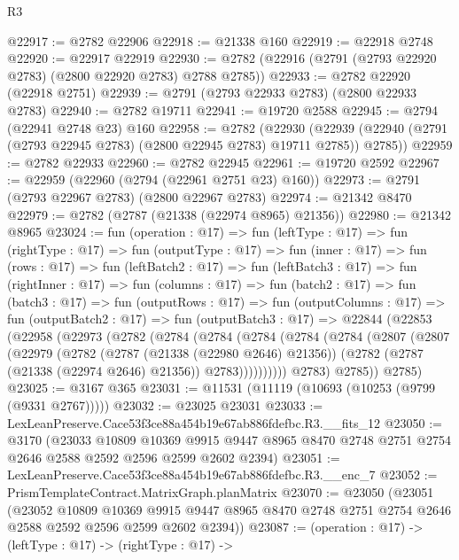 \begin{lexlean}{R3}
\begin{coremodule}
@22917 := @2782 @22906
@22918 := @21338 @160
@22919 := @22918 @2748
@22920 := @22917 @22919
@22930 := @2782 (@22916 (@2791 (@2793 @22920 @2783) (@2800 @22920 @2783) @2788 @2785))
@22933 := @2782 @22920 (@22918 @2751)
@22939 := @2791 (@2793 @22933 @2783) (@2800 @22933 @2783)
@22940 := @2782 @19711
@22941 := @19720 @2588
@22945 := @2794 (@22941 @2748 @23) @160
@22958 := @2782
    (@22930 (@22939 (@22940 (@2791 (@2793 @22945 @2783) (@2800 @22945 @2783) @19711 @2785)) @2785))
@22959 := @2782 @22933
@22960 := @2782 @22945
@22961 := @19720 @2592
@22967 := @22959 (@22960 (@2794 (@22961 @2751 @23) @160))
@22973 := @2791 (@2793 @22967 @2783) (@2800 @22967 @2783)
@22974 := @21342 @8470
@22979 := @2782 (@2787 (@21338 (@22974 @8965) @21356))
@22980 := @21342 @8965
@23024 := fun (operation : @17) =>
  fun (leftType : @17) =>
  fun (rightType : @17) =>
  fun (outputType : @17) =>
  fun (inner : @17) =>
  fun (rows : @17) =>
  fun (leftBatch2 : @17) =>
  fun (leftBatch3 : @17) =>
  fun (rightInner : @17) =>
  fun (columns : @17) =>
  fun (batch2 : @17) =>
  fun (batch3 : @17) =>
  fun (outputRows : @17) =>
  fun (outputColumns : @17) =>
  fun (outputBatch2 : @17) =>
  fun (outputBatch3 : @17) =>
  @22844
    (@22853
      (@22958
        (@22973
          (@2782
            (@2784
              (@2784
                (@2784
                  (@2784
                    (@2784
                      (@2807
                        (@2807
                          (@22979
                            (@2782
                              (@2787 (@21338 (@22980 @2646) @21356))
                              (@2782 (@2787 (@21338 (@22974 @2646) @21356)) @2783))))))))))
            @2783)
          @2785))
      @2785)
@23025 := @3167 @365
@23031 := @11531 (@11119 (@10693 (@10253 (@9799 (@9331 @2767)))))
@23032 := @23025 @23031
@23033 := LexLeanPreserve.Cace53f3ce88a454b19e67ab886fdefbc.R3.__fits_12
@23050 := @3170
    (@23033
      @10809
      @10369
      @9915
      @9447
      @8965
      @8470
      @2748
      @2751
      @2754
      @2646
      @2588
      @2592
      @2596
      @2599
      @2602
      @2394)
@23051 := LexLeanPreserve.Cace53f3ce88a454b19e67ab886fdefbc.R3.__enc_7
@23052 := PrismTemplateContract.MatrixGraph.planMatrix
@23070 := @23050
    (@23051
      (@23052
        @10809
        @10369
        @9915
        @9447
        @8965
        @8470
        @2748
        @2751
        @2754
        @2646
        @2588
        @2592
        @2596
        @2599
        @2602
        @2394))
@23087 := (operation : @17) ->
  (leftType : @17) ->
  (rightType : @17) ->

\end{coremodule}
\end{lexlean}
